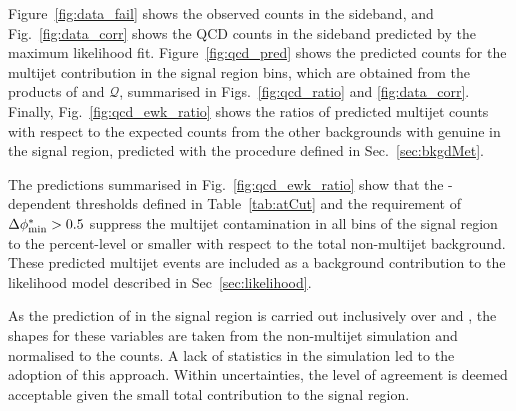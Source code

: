 Figure~\ref{fig:data_fail} shows the observed counts in the \mhtmet
sideband, and Fig.~\ref{fig:data_corr} shows the QCD counts 
in the sideband predicted by the maximum likelihood fit.
Figure~\ref{fig:qcd_pred} shows the predicted counts for the multijet
contribution in the signal region bins, which are obtained from the
products of \rmhtmet and $\mathcal{Q}$, summarised in
Figs.~\ref{fig:qcd_ratio} and \ref{fig:data_corr}. Finally,
Fig.~\ref{fig:qcd_ewk_ratio} shows the ratios of predicted multijet
counts with respect to the expected counts from the other backgrounds
with genuine \MET in the signal region, predicted with the procedure
defined in Sec.~\ref{sec:bkgdMet}.


The predictions summarised in Fig.~\ref{fig:qcd_ewk_ratio} show that 
the \HT-dependent \alphat thresholds defined in Table~\ref{tab:atCut} 
and the requirement of $\mbox{$\Delta\phi^{*}_{\rm min}$} > 0.5$ suppress the \QCD multijet
contamination in all bins of the signal region to the percent-level or smaller with
respect to the total non-multijet background. These predicted multijet events are 
included as a background contribution to the likelihood model
described in Sec~\ref{sec:likelihood}.

As the prediction of \QCD in the signal region is carried out
inclusively over \nb and \mht, the \QCD shapes for these variables are
taken from the non-multijet simulation and normalised to the \QCD counts. A
lack of statistics in the \QCD simulation led to the adoption of this approach.
Within uncertainties, the level of
agreement is deemed acceptable given the small total \QCD contribution to the
signal region.


